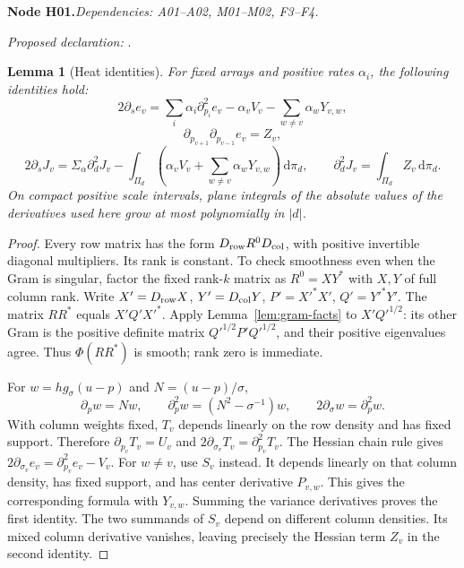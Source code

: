 \documentclass[11pt]{article}
\newtheorem{lemma}[theorem]{Lemma}
\theoremstyle{remark}\newtheorem{remark}[theorem]{Remark}
\newcommand{\dd}{\,\mathrm d}\newcommand{\tr}{\operatorname{tr}}
\newcommand{\bpnode}[3]{\par\Needspace{5\baselineskip}\noindent\textbf{Node #1.}\quad\textit{Dependencies: #2.}\par\noindent\textit{Proposed declaration:} \texttt{\detokenize{#3}}.\par\smallskip}
\begin{document}
\bpnode{H01}{A01--A02, M01--M02, F3--F4}{finite_array_heat_identities}
\begin{lemma}[Heat identities]\label{lem:heat-id}
For fixed arrays and positive rates $\alpha_i$, the following identities hold:
\[
 2\partial_s e_v=\sum_i\alpha_i\partial_{p_i}^2e_v
 -\alpha_vV_v-\sum_{w\ne v}\alpha_wY_{v,w},
\]
\[
 \partial_{p_{v+1}}\partial_{p_{v-1}}e_v=Z_v,
\]
\[
 2\partial_sJ_v=\Sigma_\alpha\partial_d^2J_v
 -\int_{\Pi_d}\left(\alpha_vV_v+\sum_{w\ne v}\alpha_wY_{v,w}\right)\dd\pi_d,
 \qquad \partial_d^2J_v=\int_{\Pi_d}Z_v\dd\pi_d.
\]
On compact positive scale intervals, plane integrals of the absolute values of the derivatives used here grow at most polynomially in $|d|$.
\end{lemma}
\begin{proof}
Every row matrix has the form $D_{\rm row}R^0D_{\rm col}$, with positive invertible diagonal multipliers. Its rank is constant. To check smoothness even when the Gram is singular, factor the fixed rank-$k$ matrix as $R^0=XY^*$ with $X,Y$ of full column rank. Write $X'=D_{\rm row}X$, $Y'=D_{\rm col}Y$, $P'=X'^*X'$, $Q'=Y'^*Y'$. The matrix $RR^*$ equals $X'Q'X'^*$. Apply Lemma~\ref{lem:gram-facts} to $X'Q'^{1/2}$: its other Gram is the positive definite matrix $Q'^{1/2}P'Q'^{1/2}$, and their positive eigenvalues agree. Thus $\Phi(RR^*)$ is smooth; rank zero is immediate.

For $w=h g_\sigma(u-p)$ and $N=(u-p)/\sigma$,
\[
 \partial_pw=Nw,\qquad \partial_p^2w=(N^2-\sigma^{-1})w,
 \qquad 2\partial_\sigma w=\partial_p^2w.
\]
With column weights fixed, $T_v$ depends linearly on the row density and has fixed support. Therefore $\partial_{p_v}T_v=U_v$ and $2\partial_{\sigma_v}T_v=\partial_{p_v}^2T_v$. The Hessian chain rule gives
$2\partial_{\sigma_v}e_v=\partial_{p_v}^2e_v-V_v$.
For $w\ne v$, use $S_v$ instead. It depends linearly on that column density, has fixed support, and has center derivative $P_{v,w}$. This gives the corresponding formula with $Y_{v,w}$. Summing the variance derivatives proves the first identity. The two summands of $S_v$ depend on different column densities. Its mixed column derivative vanishes, leaving precisely the Hessian term $Z_v$ in the second identity.


\end{proof}
\end{document}
